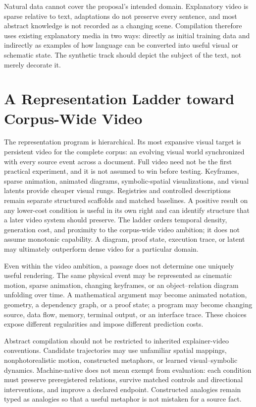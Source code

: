 \documentclass[11pt]{article}
\begin{document}
Natural data cannot cover the proposal's intended domain. Explanatory video is sparse relative to text, adaptations do not preserve every sentence, and most abstract knowledge is not recorded as a changing scene. Compilation therefore uses existing explanatory media in two ways: directly as initial training data and indirectly as examples of how language can be converted into useful visual or schematic state. The synthetic track should depict the subject of the text, not merely decorate it.

\section{A Representation Ladder toward Corpus-Wide Video}
\label{sec:representation-selection}

The representation program is hierarchical. Its most expansive visual target is persistent video for the complete corpus: an evolving visual world synchronized with every source event across a document. Full video need not be the first practical experiment, and it is not assumed to win before testing. Keyframes, sparse animation, animated diagrams, symbolic-spatial visualizations, and visual latents provide cheaper visual rungs. Registries and controlled descriptions remain separate structured scaffolds and matched baselines. A positive result on any lower-cost condition is useful in its own right and can identify structure that a later video system should preserve. The ladder orders temporal density, generation cost, and proximity to the corpus-wide video ambition; it does not assume monotonic capability. A diagram, proof state, execution trace, or latent may ultimately outperform dense video for a particular domain.

Even within the video ambition, a passage does not determine one uniquely useful rendering. The same physical event may be represented as cinematic motion, sparse animation, changing keyframes, or an object--relation diagram unfolding over time. A mathematical argument may become animated notation, geometry, a dependency graph, or a proof state; a program may become changing source, data flow, memory, terminal output, or an interface trace. These choices expose different regularities and impose different prediction costs.

Abstract compilation should not be restricted to inherited explainer-video conventions. Candidate trajectories may use unfamiliar spatial mappings, nonphotorealistic motion, constructed metaphors, or learned visual--symbolic dynamics. Machine-native does not mean exempt from evaluation: each condition must preserve preregistered relations, survive matched controls and directional interventions, and improve a declared endpoint. Constructed analogies remain typed as analogies so that a useful metaphor is not mistaken for a source fact.
\end{document}
